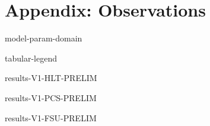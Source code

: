 \hypertarget{apx:Observations}{%
\chapter{Appendix: Observations}\label{apx:Observations}}


\newcommand{\ObservationTable}[3]{%
\begin{table}[!ht]
\centering
\caption{%
\label{tab:V#1-#3}%
Observations for \CGKAmod{#2}{T}{N}$ \models \LTLPredicate{#3}$.%
}%
{results-V#1-#3-PRELIM}
\end{table}
}

\begin{table}[!ht]
\centering
\caption{%
\label{tab:model-param-domain}%
Verification domain of \( \CGKAmod{P}{T}{N} \models \varphi \) parameters.
}%
{model-param-domain}
\end{table}

\begin{table}[!ht]
\centering
\caption{%
\label{tab:table-legend}%
Legend of symbols appearing in tables.
}%
{tabular-legend}
\end{table}

\ObservationTable{1}{\VersionOne}{HLT}
\ObservationTable{1}{\VersionOne}{PCS}
\ObservationTable{1}{\VersionOne}{FSU}

